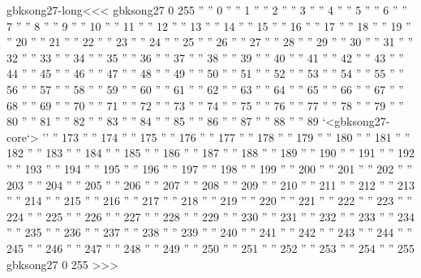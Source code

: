 \<gbksong27-long\><<<
gbksong27 0 255
'' ''           0
'' ''           1
'' ''           2
'' ''           3
'' ''           4
'' ''           5
'' ''           6
'' ''           7
'' ''           8
'' ''           9
'' ''          10
'' ''          11
'' ''          12
'' ''          13
'' ''          14
'' ''          15
'' ''          16
'' ''          17
'' ''          18
'' ''          19
'' ''          20
'' ''          21
'' ''          22
'' ''          23
'' ''          24
'' ''          25
'' ''          26
'' ''          27
'' ''          28
'' ''          29
'' ''          30
'' ''          31
'' ''          32
'' ''          33
'' ''          34
'' ''          35
'' ''          36
'' ''          37
'' ''          38
'' ''          39
'' ''          40
'' ''          41
'' ''          42
'' ''          43
'' ''          44
'' ''          45
'' ''          46
'' ''          47
'' ''          48
'' ''          49
'' ''          50
'' ''          51
'' ''          52
'' ''          53
'' ''          54
'' ''          55
'' ''          56
'' ''          57
'' ''          58
'' ''          59
'' ''          60
'' ''          61
'' ''          62
'' ''          63
'' ''          64
'' ''          65
'' ''          66
'' ''          67
'' ''          68
'' ''          69
'' ''          70
'' ''          71
'' ''          72
'' ''          73
'' ''          74
'' ''          75
'' ''          76
'' ''          77
'' ''          78
'' ''          79
'' ''          80
'' ''          81
'' ''          82
'' ''          83
'' ''          84
'' ''          85
'' ''          86
'' ''          87
'' ''          88
'' ''          89
`<gbksong27-core`>
'' ''         173
'' ''         174
'' ''         175
'' ''         176
'' ''         177
'' ''         178
'' ''         179
'' ''         180
'' ''         181
'' ''         182
'' ''         183
'' ''         184
'' ''         185
'' ''         186
'' ''         187
'' ''         188
'' ''         189
'' ''         190
'' ''         191
'' ''         192
'' ''         193
'' ''         194
'' ''         195
'' ''         196
'' ''         197
'' ''         198
'' ''         199
'' ''         200
'' ''         201
'' ''         202
'' ''         203
'' ''         204
'' ''         205
'' ''         206
'' ''         207
'' ''         208
'' ''         209
'' ''         210
'' ''         211
'' ''         212
'' ''         213
'' ''         214
'' ''         215
'' ''         216
'' ''         217
'' ''         218
'' ''         219
'' ''         220
'' ''         221
'' ''         222
'' ''         223
'' ''         224
'' ''         225
'' ''         226
'' ''         227
'' ''         228
'' ''         229
'' ''         230
'' ''         231
'' ''         232
'' ''         233
'' ''         234
'' ''         235
'' ''         236
'' ''         237
'' ''         238
'' ''         239
'' ''         240
'' ''         241
'' ''         242
'' ''         243
'' ''         244
'' ''         245
'' ''         246
'' ''         247
'' ''         248
'' ''         249
'' ''         250
'' ''         251
'' ''         252
'' ''         253
'' ''         254
'' ''         255
gbksong27 0 255
>>>

